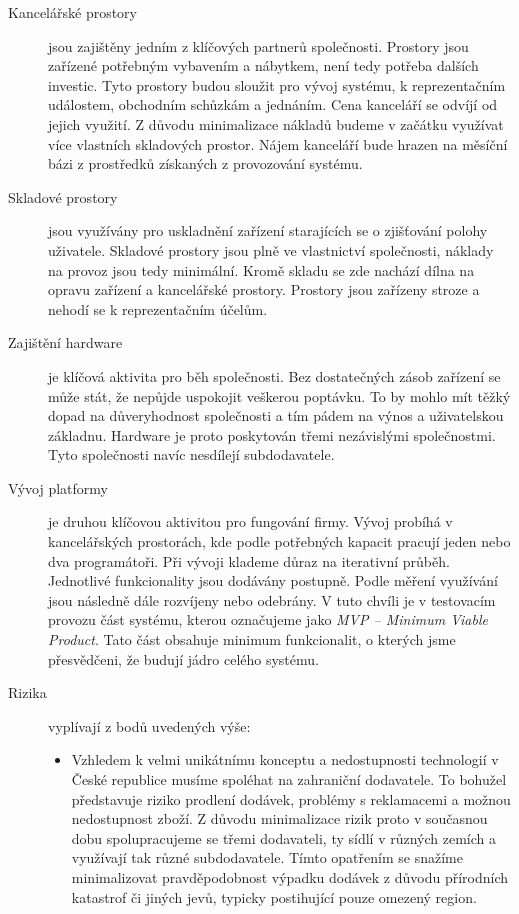\documentclass[12pt,czech]{article}
\begin{document}
\begin{description}
    \item[Kancelářské prostory] jsou zajištěny jedním z klíčových partnerů společnosti.
    Prostory jsou zařízené potřebným vybavením a nábytkem, není tedy potřeba dalších investic.
    Tyto prostory budou sloužit pro vývoj systému, k reprezentačním událostem, obchodním schůzkám a jednáním.
    Cena kanceláří se odvíjí od jejich využití.
    Z důvodu minimalizace nákladů budeme v začátku využívat více vlastních skladových prostor.
    Nájem kanceláří bude hrazen na měsíční bázi z prostředků získaných z provozování systému.
    
    \item[Skladové prostory] jsou využívány pro uskladnění zařízení starajících se o zjišťování polohy uživatele.
    Skladové prostory jsou plně ve vlastnictví společnosti, náklady na provoz jsou tedy minimální.
    Kromě skladu se zde nachází dílna na opravu zařízení a kancelářské prostory.
    Prostory jsou zařízeny stroze a nehodí se k reprezentačním účelům.
    
    \item[Zajištění hardware] je klíčová aktivita pro běh společnosti.
    Bez dostatečných zásob zařízení se může stát, že nepůjde uspokojit veškerou poptávku.
    To by mohlo mít těžký dopad na důveryhodnost společnosti a tím pádem na výnos a uživatelskou základnu.
    Hardware je proto poskytován třemi nezávislými společnostmi.
    Tyto společnosti navíc nesdílejí subdodavatele.

    \item[Vývoj platformy] je druhou klíčovou aktivitou pro fungování firmy.
    Vývoj probíhá v kancelářských prostorách, kde podle potřebných kapacit pracují jeden nebo dva programátoři.
    Při vývoji klademe důraz na iterativní průběh.
    Jednotlivé funkcionality jsou dodávány postupně.
    Podle měření využívání jsou následně dále rozvíjeny nebo odebrány.
    V tuto chvíli je v testovacím provozu část systému, kterou označujeme jako \textit{MVP -- Minimum Viable Product}.
    Tato část obsahuje minimum funkcionalit, o kterých jsme přesvědčeni, že budují jádro celého systému.

    \item[Rizika] vyplívají z bodů uvedených výše:

    \begin{itemize}
        \item Vzhledem k velmi unikátnímu konceptu a nedostupnosti technologií v České republice musíme spoléhat na zahraniční dodavatele.
        To bohužel představuje riziko prodlení dodávek, problémy s reklamacemi a možnou nedostupnost zboží.
        Z důvodu minimalizace rizik proto v současnou dobu spolupracujeme se třemi dodavateli, ty sídlí v různých zemích a využívají tak různé subdodavatele.
        Tímto opatřením se snažíme minimalizovat pravděpodobnost výpadku dodávek z důvodu přírodních katastrof či jiných jevů, typicky postihující pouze omezený region.


\end{itemize}
\end{description}
\end{document}
